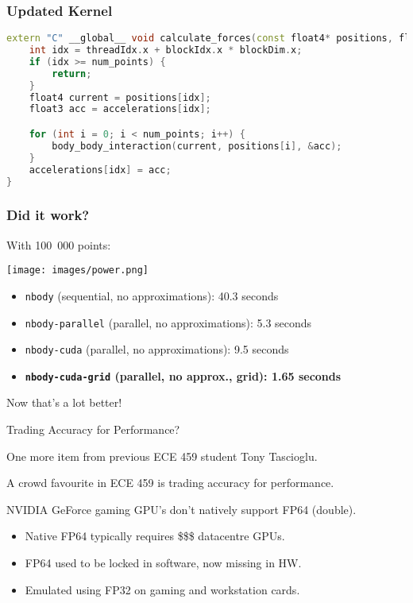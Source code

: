 \begin{frame}[fragile]
\frametitle{Updated Kernel}

\begin{lstlisting}[language=C++]
extern "C" __global__ void calculate_forces(const float4* positions, float3* accelerations, int num_points) {
    int idx = threadIdx.x + blockIdx.x * blockDim.x;
    if (idx >= num_points) {
        return;
    }
    float4 current = positions[idx];
    float3 acc = accelerations[idx];

    for (int i = 0; i < num_points; i++) {
        body_body_interaction(current, positions[i], &acc);
    }
    accelerations[idx] = acc;
}
\end{lstlisting}

\end{frame}


\begin{frame}
\frametitle{Did it work?}

With 100~000 points:

\begin{center}
	\texttt{[image: images/power.png]}
\end{center}

\begin{itemize}
	\item \texttt{nbody} (sequential, no approximations): 40.3 seconds
	\item \texttt{nbody-parallel} (parallel, no approximations): 5.3 seconds
	\item \texttt{nbody-cuda} (parallel, no approximations): 9.5 seconds
	\item \textbf{\texttt{nbody-cuda-grid} (parallel, no approx., grid): 1.65 seconds}
\end{itemize}

 Now that's a lot better!

\end{frame}

\begin{frame}{Trading Accuracy for Performance?}

	One more item from previous ECE 459 student Tony Tascioglu.


	A crowd favourite in ECE 459 is trading accuracy for performance.


NVIDIA GeForce gaming GPU's don't natively support FP64 (double).
		\begin{itemize}
			\item Native FP64 typically requires \$\$\$ datacentre GPUs.
			\item FP64 used to be locked in software, now missing in HW.
			\item Emulated using FP32 on gaming and workstation cards.
		\end{itemize}
		
\end{frame}

